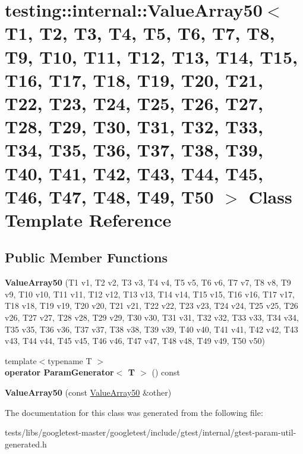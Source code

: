 \hypertarget{classtesting_1_1internal_1_1ValueArray50}{}\section{testing\+:\+:internal\+:\+:Value\+Array50$<$ T1, T2, T3, T4, T5, T6, T7, T8, T9, T10, T11, T12, T13, T14, T15, T16, T17, T18, T19, T20, T21, T22, T23, T24, T25, T26, T27, T28, T29, T30, T31, T32, T33, T34, T35, T36, T37, T38, T39, T40, T41, T42, T43, T44, T45, T46, T47, T48, T49, T50 $>$ Class Template Reference}
\label{classtesting_1_1internal_1_1ValueArray50}
\subsection*{Public Member Functions}
\begin{DoxyCompactItemize}
\item 
\mbox{\label{classtesting_1_1internal_1_1ValueArray50_af48a47a824b188be4674285466bebf4b}} 
{\bfseries Value\+Array50} (T1 v1, T2 v2, T3 v3, T4 v4, T5 v5, T6 v6, T7 v7, T8 v8, T9 v9, T10 v10, T11 v11, T12 v12, T13 v13, T14 v14, T15 v15, T16 v16, T17 v17, T18 v18, T19 v19, T20 v20, T21 v21, T22 v22, T23 v23, T24 v24, T25 v25, T26 v26, T27 v27, T28 v28, T29 v29, T30 v30, T31 v31, T32 v32, T33 v33, T34 v34, T35 v35, T36 v36, T37 v37, T38 v38, T39 v39, T40 v40, T41 v41, T42 v42, T43 v43, T44 v44, T45 v45, T46 v46, T47 v47, T48 v48, T49 v49, T50 v50)
\item 
\mbox{\label{classtesting_1_1internal_1_1ValueArray50_ac78bd46562b55fbf25760e08820865d8}} 
{\footnotesize template$<$typename T $>$ }\\{\bfseries operator Param\+Generator$<$ T $>$} () const
\item 
\mbox{\label{classtesting_1_1internal_1_1ValueArray50_add43e888b3f6efd8f9c1b5829ecd1fd7}} 
{\bfseries Value\+Array50} (const \hyperlink{classtesting_1_1internal_1_1ValueArray50}{Value\+Array50} \&other)
\end{DoxyCompactItemize}


The documentation for this class was generated from the following file\+:\begin{DoxyCompactItemize}
\item 
tests/libs/googletest-\/master/googletest/include/gtest/internal/gtest-\/param-\/util-\/generated.\+h\end{DoxyCompactItemize}
